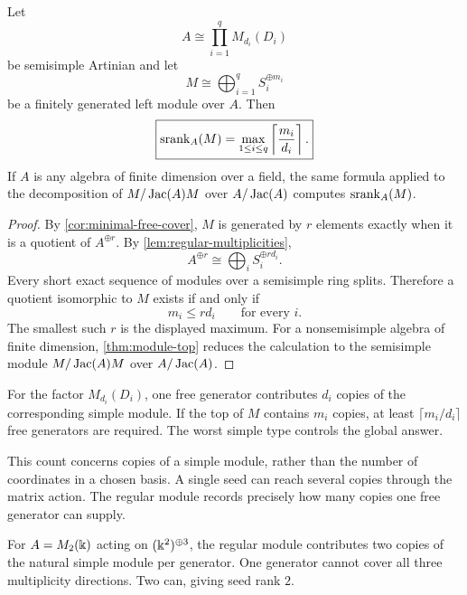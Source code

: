 \begin{theorem}
\label{thm:semisimple-seed-rank}
Let
\[
A\cong\prod_{i=1}^{q}M_{d_i}(D_i)
\]
be semisimple Artinian and let
\[
M\cong\bigoplus_{i=1}^{q}S_i^{\oplus m_i}
\]
be a finitely generated left module over $A$.  Then
\[
\boxed{
\operatorname{srank}_A(M)
=
\max_{1\leq i\leq q}
\left\lceil\frac{m_i}{d_i}\right\rceil.
}
\]
If $A$ is any algebra of finite dimension over a field, the same formula applied to the decomposition of $M/\operatorname{Jac}(A)M$ over $A/\operatorname{Jac}(A)$ computes $\operatorname{srank}_A(M)$.
\end{theorem}

\begin{proof}
By \cref{cor:minimal-free-cover}, $M$ is generated by $r$ elements exactly when it is a quotient of $A^{\oplus r}$.  By \cref{lem:regular-multiplicities},
\[
A^{\oplus r}\cong\bigoplus_iS_i^{\oplus rd_i}.
\]
Every short exact sequence of modules over a semisimple ring splits.  Therefore a quotient isomorphic to $M$ exists if and only if
\[
m_i\leq rd_i
\qquad\text{for every }i.
\]
The smallest such $r$ is the displayed maximum.  For a nonsemisimple algebra of finite dimension, \cref{thm:module-top} reduces the calculation to the semisimple module $M/\operatorname{Jac}(A)M$ over $A/\operatorname{Jac}(A)$.
\end{proof}

\begin{interpretation}
For the factor \(M_{d_i}(D_i)\), one free generator contributes \(d_i\) copies of the corresponding simple module.  If the top of \(M\) contains \(m_i\) copies, at least \(\lceil m_i/d_i\rceil\) free generators are required.  The worst simple type controls the global answer.

This count concerns copies of a simple module, rather than the number of coordinates in a chosen basis.  A single seed can reach several copies through the matrix action.  The regular module records precisely how many copies one free generator can supply.
\end{interpretation}

\begin{microexample}[title={Multiplicity consumes seed capacity}]
For \(A=M_2(\Bbbk)\) acting on \((\Bbbk^2)^{\oplus3}\), the regular module contributes two copies of the natural simple module per generator.  One generator cannot cover all three multiplicity directions.  Two can, giving seed rank \(2\).
\end{microexample}


